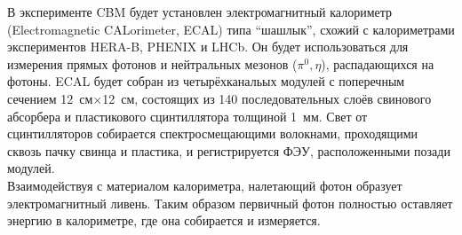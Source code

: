 \begin{minipage}[t]{0.495\textwidth}
В эксперименте CBM будет установлен электромагнитный калориметр (Electromagnetic CALorimeter, ECAL) типа ``шашлык'', схожий с калориметрами экспериментов HERA-B, PHENIX и LHCb. Он будет использоваться для измерения прямых фотонов и нейтральных мезонов ($ \pi^{0}, \eta $), распадающихся на фотоны.
ECAL будет собран из четырёхканальых модулей с поперечным сечением 12~см$\times$12~см, состоящих из 140 последовательных слоёв свинового абсорбера и пластикового сцинтиллятора толщиной 1~мм. Свет от сцинтилляторов собирается спектросмещающими волокнами, проходящими сквозь пачку свинца и пластика, и регистрируется ФЭУ, расположенными позади модулей. \\
Взаимодействуя с материалом калориметра, налетающий фотон образует электромагнитный ливень. Таким образом первичный фотон полностью оставляет энергию в калориметре, где она собирается и измеряется. \\

\end{minipage}
